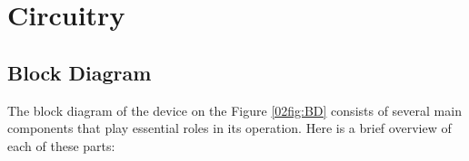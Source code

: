 








\section{Circuitry}\label{02Sec:Circuitry}




\subsection{Block Diagram}\label{02Sub:BlockDiagram}


The block diagram of the device on the Figure \ref{02fig:BD} consists of several main components that play essential roles in its operation. 
Here is a brief overview of each of these parts:

